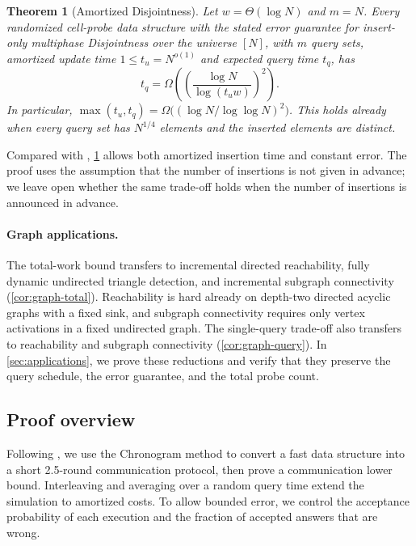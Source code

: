 \documentclass[11pt]{article}
\theoremstyle{plain}
\newtheorem{theorem}{Theorem}[section]
\begin{document}
\begin{theorem}[Amortized Disjointness]\label{thm:disj}
Let $w=\Theta(\log N)$ and $m=N$. Every randomized cell-probe data structure with the stated error guarantee for insert-only multiphase Disjointness over the universe $[N]$, with $m$ query sets, amortized update time $1\le t_u=N^{o(1)}$ and expected query time $t_q$, has
\[ t_q=\Omega\!\left(\left(\frac{\log N}{\log(t_uw)}\right)^{2}\right). \]
In particular, $\max(t_u,t_q)=\Omega\big((\log N/\log\log N)^2\big)$. This holds already when every query set has $N^{1/4}$ elements and the inserted elements are distinct.
\end{theorem}

Compared with \cite{ko_omegalog_2026}, \cref{thm:disj} allows both amortized insertion time and constant error. The proof uses the assumption that the number of insertions is not given in advance; we leave open whether the same trade-off holds when the number of insertions is announced in advance.

\paragraph{Graph applications.}
The total-work bound transfers to incremental directed reachability, fully dynamic undirected triangle detection, and incremental subgraph connectivity (\cref{cor:graph-total}). Reachability is hard already on depth-two directed acyclic graphs with a fixed sink, and subgraph connectivity requires only vertex activations in a fixed undirected graph. The single-query trade-off also transfers to reachability and subgraph connectivity (\cref{cor:graph-query}). In \cref{sec:applications}, we prove these reductions and verify that they preserve the query schedule, the error guarantee, and the total probe count.

\subsection{Proof overview}\label{sec:overview}

Following \cite{ko_omega_2026,ko_omegalog_2026}, we use the Chronogram method to convert a fast data structure into a short 2.5-round communication protocol, then prove a communication lower bound. Interleaving and averaging over a random query time extend the simulation to amortized costs. To allow bounded error, we control the acceptance probability of each execution and the fraction of accepted answers that are wrong.
\end{document}

